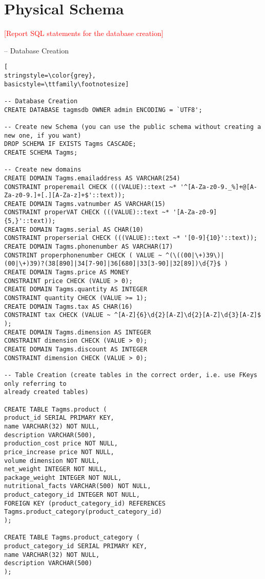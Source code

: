 \section{Physical Schema}
\textcolor{red}{[Report SQL statements for the database creation]}

-- Database Creation
\begin{lstlisting}[
stringstyle=\color{grey},
basicstyle=\ttfamily\footnotesize]

-- Database Creation
CREATE DATABASE tagmsdb OWNER admin ENCODING = `UTF8';

-- Create new Schema (you can use the public schema without creating a new one, if you want)
DROP SCHEMA IF EXISTS Tagms CASCADE;
CREATE SCHEMA Tagms;

-- Create new domains
CREATE DOMAIN Tagms.emailaddress AS VARCHAR(254)
CONSTRAINT properemail CHECK (((VALUE)::text ~* '^[A-Za-z0-9._%]+@[A-Za-z0-9.]+[.][A-Za-z]+$'::text));
CREATE DOMAIN Tagms.vatnumber AS VARCHAR(15)
CONSTRAINT properVAT CHECK (((VALUE)::text ~* '[A-Za-z0-9]{5,}'::text));
CREATE DOMAIN Tagms.serial AS CHAR(10)
CONSTRAINT properserial CHECK (((VALUE)::text ~* '[0-9]{10}'::text));
CREATE DOMAIN Tagms.phonenumber AS VARCHAR(17)
CONSTRINT properphonenumber CHECK ( VALUE ~ ^(\((00|\+)39\)|(00|\+)39)?(38[890]|34[7-90]|36[680]|33[3-90]|32[89])\d{7}$ )
CREATE DOMAIN Tagms.price AS MONEY
CONSTRAINT price CHECK (VALUE > 0);
CREATE DOMAIN Tagms.quantity AS INTEGER
CONSTRAINT quantity CHECK (VALUE >= 1);
CREATE DOMAIN Tagms.tax AS CHAR(16)
CONSTRAINT tax CHECK (VALUE ~ ^[A-Z]{6}\d{2}[A-Z]\d{2}[A-Z]\d{3}[A-Z]$ );
CREATE DOMAIN Tagms.dimension AS INTEGER
CONSTRAINT dimension CHECK (VALUE > 0);
CREATE DOMAIN Tagms.discount AS INTEGER
CONSTRAINT dimension CHECK (VALUE > 0);

-- Table Creation (create tables in the correct order, i.e. use FKeys only referring to
already created tables)

CREATE TABLE Tagms.product (
product_id SERIAL PRIMARY KEY,
name VARCHAR(32) NOT NULL,
description VARCHAR(500),
production_cost price NOT NULL,
price_increase price NOT NULL,
volume dimension NOT NULL,
net_weight INTEGER NOT NULL,
package_weight INTEGER NOT NULL,
nutritional_facts VARCHAR(500) NOT NULL,
product_category_id INTEGER NOT NULL,
FOREIGN KEY (product_category_id) REFERENCES Tagms.product_category(product_category_id)
);

CREATE TABLE Tagms.product_category (
product_category_id SERIAL PRIMARY KEY,
name VARCHAR(32) NOT NULL,
description VARCHAR(500)
);


\end{lstlisting}
